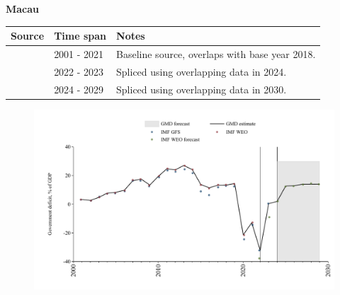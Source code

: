 \documentclass[12pt,a4paper,landscape]{article}
\begin{document}
\begin{adjustbox}{max totalsize={\paperwidth}{\paperheight},center}
\begin{minipage}[t][\textheight][t]{\textwidth}
\vspace*{0.5cm}
{}
\begin{center}
{\Large\bfseries Macau}
\end{center}
\vspace{0.5cm}
\begin{table}[H]
\centering
\small
\begin{tabular}{|l|l|l|}
\hline
\textbf{Source} & \textbf{Time span} & \textbf{Notes} \\
\hline
\rowcolor{white}\cite{IMF_WEO}& 2001 - 2021 &Baseline source, overlaps with base year 2018.\\
\rowcolor{lightgray}\cite{IMF_GFS}& 2022 - 2023 &Spliced using overlapping data in 2024.\\
\rowcolor{white}\cite{IMF_WEO_forecast}& 2024 - 2029 &Spliced using overlapping data in 2030.\\
\hline
\end{tabular}
\end{table}
\begin{figure}[H]
\centering
\includegraphics[width=\textwidth,height=0.6\textheight,keepaspectratio]{graphs/MAC_govdef_GDP.pdf}
\end{figure}
\end{minipage}
\end{adjustbox}
\end{document}
